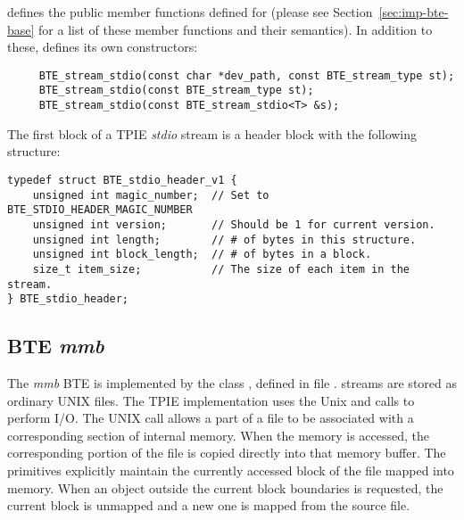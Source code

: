  defines the public member
functions defined for  (please
see Section~\ref{sec:imp-bte-base} for a list of these
member functions and their semantics).   In addition to these,
 defines its own
constructors:

\begin{verbatim}
     BTE_stream_stdio(const char *dev_path, const BTE_stream_type st); 
     BTE_stream_stdio(const BTE_stream_type st); 
     BTE_stream_stdio(const BTE_stream_stdio<T> &s);
\end{verbatim}

The first block of a TPIE \emph{stdio} stream is a header
block
 with the following structure:

\begin{verbatim}
typedef struct BTE_stdio_header_v1 { 
    unsigned int magic_number;  // Set to BTE_STDIO_HEADER_MAGIC_NUMBER
    unsigned int version;       // Should be 1 for current version.
    unsigned int length;        // # of bytes in this structure.
    unsigned int block_length;  // # of bytes in a block.
    size_t item_size;           // The size of each item in the stream.
} BTE_stdio_header;
\end{verbatim}




\subsection{BTE \emph{mmb}}

The \emph{mmb} BTE is implemented by the class
, defined in file
.  
streams are stored as ordinary UNIX files.  The TPIE
 implementation uses the Unix
 and  calls to perform I/O. The
UNIX  call allows a part of a file to be
associated with a corresponding section of internal memory.
When the memory is accessed, the corresponding portion of
the file is copied directly into that memory buffer. The
 primitives explicitly maintain the
currently accessed block of the file mapped into memory.
When an object outside the current block boundaries is
requested, the current block is unmapped and a new one is
mapped from the source file.

